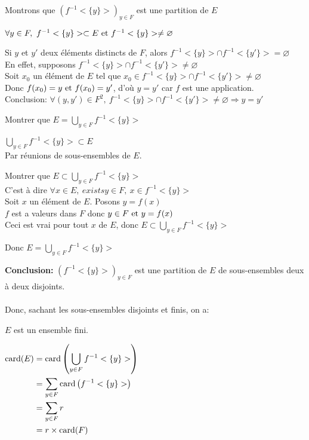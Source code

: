 \documentclass[12pt,twoside,a4paper]{article}
\begin{document}
	\begin{preuve}
		Montrons que $\left(f^{-1}<\{y\}> \right)_{y\in F}$ est une partition de $E$
		\begin{liste}
			\item $\forall y\in F,\ f^{-1}<\{y\}>\subset E\et f^{-1}<\{y\}>\neq \varnothing$\\
			\item Si $y$ et $y'$ deux \'el\'ements distincts de $F$, alors $f^{-1}<\{y\}>\cap f^{-1}<\{y'\}>=\varnothing$\\
				En effet, supposons $f^{-1}<\{y\}>\cap f^{-1}<\{y'\}>\neq\varnothing$\\
				Soit $x_0$ un \'el\'ement de $E$ tel que $x_0\in f^{-1}<\{y\}>\cap f^{-1}<\{y'\}>\neq\varnothing$\\
				Donc $f(x_0)=y\text{ et } f(x_0)=y'$, d'o\`u $y=y'$ car $f$ est une application.\\
				Conclusion: $\forall (y,y')\in F^{2},\ f^{-1}<\{y\}>\cap f^{-1}<\{y'\}>\neq\varnothing\Rightarrow y=y'$\\
			\item Montrer que $E=\bigcup\limits_{y\in F}f^{-1}<\{y\}>$
			\begin{liste}
				\item $\bigcup\limits_{y\in F}f^{-1}<\{y\}>\subset E$\\
					Par r\'eunions de sous-ensembles de $E$.
				\item Montrer que $E\subset\bigcup\limits_{y\in F}f^{-1}<\{y\}>$\\
					C'est \`a dire $\forall x\in E,\ exists y\in F,\ x\in f^{-1}<\{y\}>$\\
					Soit $x$ un \'el\'ement de $E$. Posons $y=f(x)$\\
					$f$ est a valeurs dans $F$ donc $y\in F\text{ et } y=f(x)$\\
					Ceci est vrai pour tout $x$ de $E$, donc $E\subset\bigcup\limits_{y\in F}f^{-1}<\{y\}>$
			\end{liste}
			Donc $E=\bigcup\limits_{y\in F}f^{-1}<\{y\}>$
		\end{liste}
		\textbf{Conclusion:} $\left(f^{-1}<\{y\}> \right)_{y\in F}$ est une partition de $E$ de sous-ensembles deux \`a deux disjoints.\\
		\\
		Donc, sachant les sous-ensembles disjoints et finis, on a:
		\begin{liste}
			\item $E$ est un ensemble fini.
			\item $\begin{aligned}[t]
			\text{card}(E) & = \text{card}\left( \bigcup\limits_{y\in F}f^{-1}<\{y\}>\right)\\
				& = \sum\limits_{y\in F}\text{card}\left( f^{-1}<\{y\}>\right)\\
				& = \sum\limits_{y\in F} r\\
				& = r\times \text{card}(F)
			\end{aligned}$
		\end{liste}
	\end{preuve}
\end{document}
